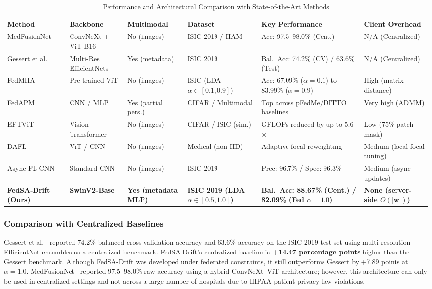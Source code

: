 \documentclass{ieeeaccess}
\newcommand{\sadrift}{FedSA-Drift}
\begin{document}
\begin{table}[t]
\centering
\caption{Performance and Architectural Comparison with State-of-the-Art Methods}
\label{tab:sota_comparison}
\begin{tabular}{p{2.8cm}p{2.4cm}p{2.2cm}p{2.0cm}p{3.2cm}p{2.8cm}}
\toprule
Method & Backbone & Multimodal & Dataset & Key Performance & Client Overhead \\
\midrule
MedFusionNet~\cite{Naeem2025} & ConvNeXt + ViT-B16 & No (images) & ISIC 2019 / HAM & Acc: 97.5--98.0\% (Cent.) & N/A (Centralized) \\
Gessert et al.~\cite{Gessert2020} & Multi-Res EfficientNets & Yes (metadata) & ISIC 2019 & Bal.\ Acc: 74.2\% (CV) / 63.6\% (Test) & N/A (Centralized) \\
FedMHA~\cite{Darzi2024} & Pre-trained ViT & No (images) & ISIC (LDA $\alpha \in [0.1, 0.9]$) & Acc: 67.09\% ($\alpha{=}0.1$) to 83.99\% ($\alpha{=}0.9$) & High (matrix distance) \\
FedAPM~\cite{Zhu2025} & CNN / MLP & Yes (partial pers.) & CIFAR / Multimodal & Top across pFedMe/DITTO baselines & Very high (ADMM) \\
EFTViT~\cite{Wu2024} & Vision Transformer & No (images) & CIFAR / ISIC (sim.) & GFLOPs reduced by up to 5.6$\times$ & Low (75\% patch mask) \\
DAFL~\cite{Zhao2025} & ViT / CNN & No (images) & Medical (non-IID) & Adaptive focal reweighting & Medium (local focal tuning) \\
Async-FL-CNN~\cite{Yaqoob2023} & Standard CNN & No (images) & ISIC 2019 & Prec: 96.7\% / Spec: 96.3\% & Medium (async updates) \\
\midrule
\textbf{\sadrift{} (Ours)} & \textbf{SwinV2-Base} & \textbf{Yes (metadata MLP)} & \textbf{ISIC 2019 (LDA $\alpha \in [0.5, 1.0]$)} & \textbf{Bal.\ Acc: 88.67\% (Cent.) / 82.09\% (Fed $\alpha{=}1.0$)} & \textbf{None (server-side $O(|\mathbf{w}|)$)} \\
\bottomrule
\end{tabular}
\end{table}

\subsubsection{Comparison with Centralized Baselines}

Gessert et al.~\cite{Gessert2020} reported 74.2\% balanced cross-validation accuracy and 63.6\% accuracy on the ISIC 2019 test set using multi-resolution EfficientNet ensembles as a centralized benchmark. \sadrift{}'s centralized baseline is \textbf{+14.47 percentage points} higher than the Gessert benchmark. Although \sadrift{} was developed under federated constraints, it still outperforms Gessert by +7.89 points at $\alpha = 1.0$. MedFusionNet~\cite{Naeem2025} reported 97.5--98.0\% raw accuracy using a hybrid ConvNeXt--ViT architecture; however, this architecture can only be used in centralized settings and not across a large number of hospitals due to HIPAA patient privacy law violations.
\end{document}
